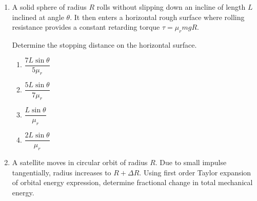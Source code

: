 \documentclass[12pt]{article}
\begin{document}
\begin{enumerate}
\begin{enumerate}
\item $\dfrac{2\mu mg}{k}$
\item $\dfrac{3\mu mg}{k}$
\item $\dfrac{\mu mg}{k}$
\item $\dfrac{4\mu mg}{k}$
\end{enumerate}

\item
A solid sphere of radius $R$ rolls without slipping down an incline of length $L$ inclined at angle $\theta$. 
It then enters a horizontal rough surface where rolling resistance provides a constant retarding torque 
$\tau = \mu_r mgR$.

Determine the stopping distance on the horizontal surface.

\begin{center}
\end{center}

\begin{enumerate}
\item $\dfrac{7L\sin\theta}{5\mu_r}$
\item $\dfrac{5L\sin\theta}{7\mu_r}$
\item $\dfrac{L\sin\theta}{\mu_r}$
\item $\dfrac{2L\sin\theta}{\mu_r}$
\end{enumerate}

\item
A satellite moves in circular orbit of radius $R$. Due to small impulse tangentially, radius increases to $R+\Delta R$. Using first order Taylor expansion of orbital energy expression, determine fractional change in total mechanical energy.


\end{enumerate}
\end{document}
